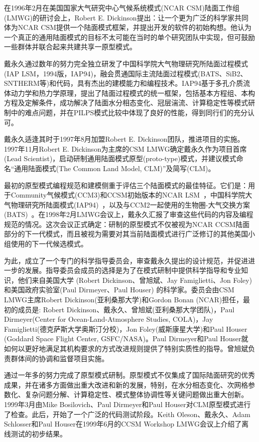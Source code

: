 在1996年2月在美国国家大气研究中心气候系统模式(NCAR CSM)陆面工作组(LMWG)的研讨会上，Robert E. Dickinson提出：让一个更为广泛的科学家共同体为NCAR CSM提供一个陆面模式框架，并提出开发的软件的初始构想。他认为一个真正的通用陆面模式的目标不太可能在当时的单个研究团队中实现，但可鼓励一些群体并联合起来共建共享一原型模式。

戴永久通过数年的努力完全独立研发了中国科学院大气物理研究所陆面过程模式(IAP LSM，1994版，IAP94)，融会贯通国际主流陆面过程模式(BATS、SiB2、SNTHERM等)和代码，具有杰出的建模能力和编程技术。IAP94基于多孔介质流体动力学和热力学原理，提出了陆面过程模式的统一框架，包括基本方程组、本构方程及定解条件，成功解决了陆面水分相态变化、冠层湍流、计算稳定性等模式研制中的难点问题，并在PILPS模式比较中体现了良好的性能，得到同行们的充分认可。

戴永久适逢其时于1997年8月加盟Robert E. Dickinson团队，推进项目的实施。1997年11月Robert E. Dickinson为主席的CSM LMWG确定戴永久作为项目首席(Lead Scientist)，启动研制通用陆面模式原型(proto-type)模式，并建议模式命名“通用陆面模式(The Common Land Model, CLM)”及简写(CLM)。

最初的原型模式编程规范和建模侧重于评估三个陆面模式的最佳特征。它们是：用于Community气候模式(CCM3)和CCSM初始版本的NCAR LSM~\citep{bonan1996land}，中国科学院大气物理研究所陆面模式(IAP94)~\citep{Dai-Zeng_97_IAP94}，以及与CCM2一起使用的生物圈-大气交换方案(BATS)~\citep{dickinson1993biosphere}。在1998年2月LMWG会议上，戴永久汇报了审查这些代码的内容及编程规范的情况。这次会议正式确定：研制的原型模式不仅被视为NCAR CCSM陆面部分的下一代模式，而且被视为需要对其当前陆面模式进行广泛修订的其他美国小组使用的下一代候选模式。

为此，成立了一个专门的科学指导委员会，审查戴永久提出的设计规范，并促进进一步的发展。指导委员会成员的选择是为了在模式研制中提供科学指导和专业知识，他们来自美国大学 (Robert Dickinson、曾旭斌、Jay Famiglietti、Jon Foley)和美国政府实验室(Paul Dirmeyer、Paul Houser) 的科学家。委员会由CSM LMWG主席Robert Dickinson(亚利桑那大学)和Gordon Bonan (NCAR)担任，最初的成员是: Robert Dickinson、戴永久、曾旭斌(亚利桑那大学团队)，Paul Dirmeyer(Center for Ocean-Land-Atmosphere Studies, COLA)，Jay Famiglietti(德克萨斯大学奥斯汀分校)，Jon Foley(威斯康星大学)和Paul Houser (Goddard Space Flight Center, GSFC/NASA)。Paul Dirmeyer和Paul Houser就如何以更好地满足其机构要求的方式改进规则提供了特别实质性的指导。曾旭斌负责群体间的协调和监督项目实施。

通过一年多的努力完成了原型模式研制。原型模式不仅集成了国际陆面研究的优秀成果，并在诸多方面做出重大改进和新的发展，特别，在水分相态变化、次网格参数化、复杂问题分解、计算稳定性、模式整体协调性等关键问题做出重大创新。1999年3月由Mike Bosilovich、Paul Dirmeyer和Paul Houser对CLM原型模式进行了检查。此后，开始了一个广泛的代码测试阶段。Keith Oleson、戴永久、Adam Schlosser和Paul Houser在1999年6月的CCSM Workshop LMWG会议上介绍了离线测试的初步结果。

